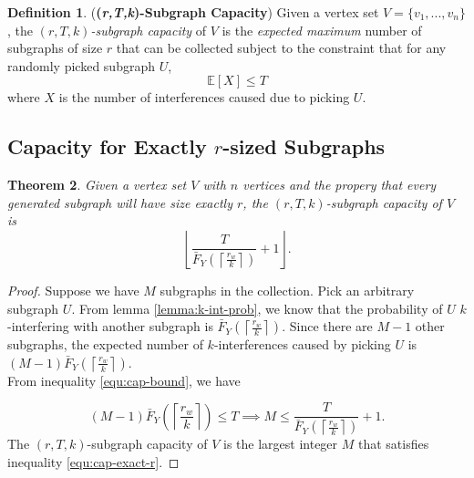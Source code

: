 \documentclass[10pt]{extarticle}
\newcommand{\E}{\mathbb{E}}
\newtheorem{theorem}{Theorem}
\theoremstyle{definition}
\newtheorem{definition}[theorem]{Definition}
\begin{document}
\begin{definition} (\textbf{(\textit{r,T,k})-Subgraph Capacity}) Given a vertex set $V = \{v_1,...,v_n\}$, the \textit{$(r,T,k)$-subgraph capacity} of $V$ is the \textit{expected maximum} number of subgraphs of size $r$ that can be collected subject to the constraint that for any randomly picked subgraph $U$, 
\begin{equation}
\label{equ:cap-bound}
    \E[X] \le T
\end{equation}
where $X$ is the number of interferences caused due to picking $U$. 
\end{definition}

\subsection{Capacity for Exactly $r$-sized Subgraphs}

\begin{theorem}
    Given a vertex set $V$ with $n$ vertices and the propery that every generated subgraph will have size exactly $r$, the $(r,T,k)$-subgraph capacity of $V$ is 
    \begin{equation*}
        \left\lfloor \frac{T}{\bar{F}_Y\left(\left\lceil \frac{r_w}{k} \right\rceil\right)} + 1 \right\rfloor.
    \end{equation*}
\end{theorem}

\begin{proof}
    Suppose we have $M$ subgraphs in the collection. Pick an arbitrary subgraph $U$. From lemma \ref{lemma:k-int-prob}, we know that the probability of $U$ $k$-interfering with another subgraph is $\bar{F}_Y\left(\left\lceil \frac{r_w}{k} \right\rceil\right)$. Since there are $M-1$ other subgraphs, the expected number of $k$-interferences caused by picking $U$ is $(M-1) \bar{F}_Y\left(\left\lceil \frac{r_w}{k} \right\rceil\right)$. \\

\noindent From inequality \ref{equ:cap-bound}, we have 

    \begin{equation}
    \label{equ:cap-exact-r}
        (M-1) \bar{F}_Y\left(\left\lceil \frac{r_w}{k} \right\rceil\right) \le T \implies M \le \frac{T}{\bar{F}_Y\left(\left\lceil \frac{r_w}{k} \right\rceil\right)} + 1.
    \end{equation}
    The $(r,T,k)$-subgraph capacity of $V$ is the largest integer $M$ that satisfies inequality \ref{equ:cap-exact-r}.
\end{proof}
\end{document}
